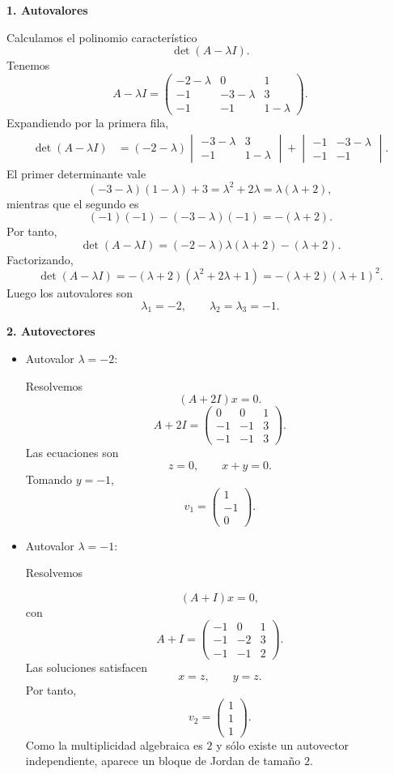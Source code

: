 \documentclass[11pt,spanish]{article}
\newcounter{solucion}
\begin{document}
{\bf 1. Autovalores}

Calculamos el polinomio característico
$$
\det(A-\lambda I).
$$
Tenemos
$$
A-\lambda I=
\begin{pmatrix}
-2-\lambda&0&1\\
-1&-3-\lambda&3\\
-1&-1&1-\lambda
\end{pmatrix}.
$$
Expandiendo por la primera fila,
$$
\begin{aligned}
\det(A-\lambda I)
&=(-2-\lambda)
\begin{vmatrix}
-3-\lambda&3\\
-1&1-\lambda
\end{vmatrix}
+
\begin{vmatrix}
-1&-3-\lambda\\
-1&-1
\end{vmatrix}.
\end{aligned}
$$
El primer determinante vale
$$
(-3-\lambda)(1-\lambda)+3
=\lambda^2+2\lambda
=\lambda(\lambda+2),
$$
mientras que el segundo es
$$
(-1)(-1)-(-3-\lambda)(-1)
=-(\lambda+2).
$$
Por tanto,
$$
\det(A-\lambda I)
=(-2-\lambda)\lambda(\lambda+2)-(\lambda+2).
$$
Factorizando,
$$
\det(A-\lambda I)
=-(\lambda+2)(\lambda^2+2\lambda+1)
=-(\lambda+2)(\lambda+1)^2.
$$
Luego los autovalores son
$$
\boxed{\lambda_1=-2,\qquad
\lambda_2=\lambda_3=-1.}
$$

{\bf 2. Autovectores}

\begin{itemize}
\item Autovalor $\lambda=-2$:

Resolvemos
$$
(A+2I)x=0.
$$
$$
A+2I=
\begin{pmatrix}
0&0&1\\
-1&-1&3\\
-1&-1&3
\end{pmatrix}.
$$
Las ecuaciones son
$$
z=0,\qquad
x+y=0.
$$
Tomando $y=-1$,
$$
v_1=
\begin{pmatrix}
1\\
-1\\
0
\end{pmatrix}.
$$

\item Autovalor $\lambda=-1$:

Resolvemos

$$
(A+I)x=0,
$$
con
$$
A+I=
\begin{pmatrix}
-1&0&1\\
-1&-2&3\\
-1&-1&2
\end{pmatrix}.
$$
Las soluciones satisfacen
$$
x=z,\qquad y=z.
$$
Por tanto,
$$
v_2=
\begin{pmatrix}
1\\
1\\
1
\end{pmatrix}.
$$
Como la multiplicidad algebraica es $2$ y sólo existe un autovector independiente, aparece un bloque de Jordan de tamaño $2$.
\end{itemize}
\end{document}
